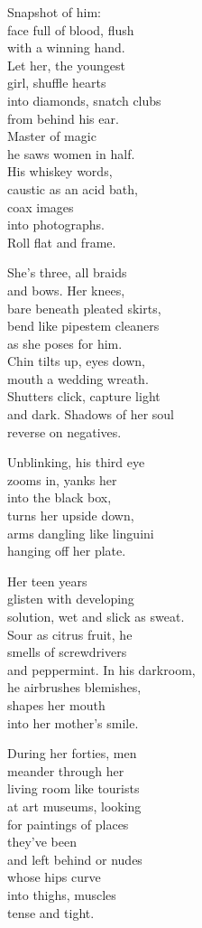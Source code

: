 \documentclass[twoside,10pt]{book}
\begin{document}
Snapshot of him:\\
face full of blood, flush\\
with a winning hand.\\
Let her, the youngest\\
girl, shuffle hearts\\
into diamonds, snatch clubs\\
from behind his ear.\\
Master of magic\\
he saws women in half.\\
His whiskey words,\\
caustic as an acid bath,\\
coax images\\
into photographs.\\
Roll flat and frame.

She's three, all braids\\
and bows. Her knees,\\
bare beneath pleated skirts,\\
bend like pipestem cleaners\\
as she poses for him.\\
Chin tilts up, eyes down,\\
mouth a wedding wreath.\\
Shutters click, capture light\\
and dark. Shadows of her soul\\
reverse on negatives.

Unblinking, his third eye\\
zooms in, yanks her\\
into the black box,\\
turns her upside down,\\
arms dangling like linguini\\
hanging off her plate.

Her teen years\\
glisten with developing\\
solution, wet and slick as sweat.\\
Sour as citrus fruit, he\\
smells of screwdrivers\\
and peppermint. In his darkroom,\\
he airbrushes blemishes,\\
shapes her mouth\\
into her mother's smile.

During her forties, men\\
meander through her\\
living room like tourists\\
at art museums, looking\\
for paintings of places\\
they've been\\
and left behind or nudes\\
whose hips curve\\
into thighs, muscles\\
tense and tight.
\end{document}
